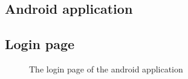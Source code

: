 \documentclass[11pt, a4paper]{article}
\begin{document}
\begin{appendices}

\section{Android application}

\subsection{Login page} %
\begin{figure}[ht]
\centering
{}
\caption{The login page of the android application}
\end{figure}
\clearpage


\end{appendices}
\end{document}
